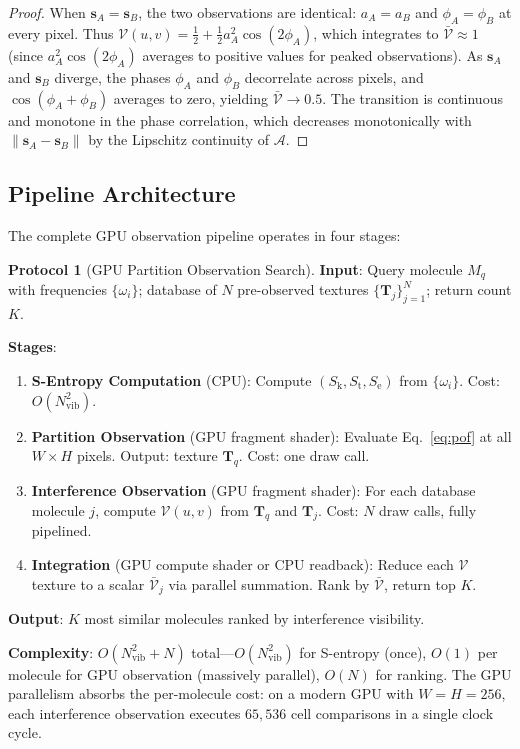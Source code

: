 \documentclass[11pt,twocolumn,a4paper]{article}
\theoremstyle{definition}
\newtheorem{protocol}[theorem]{Protocol}
\theoremstyle{remark}
\newcommand{\Sk}{S_{\mathrm{k}}}
\newcommand{\St}{S_{\mathrm{t}}}
\newcommand{\Se}{S_{\mathrm{e}}}
\newcommand{\Nvib}{N_{\mathrm{vib}}}
\begin{document}
\begin{proof}
When $\mathbf{s}_A = \mathbf{s}_B$, the two observations are identical: $a_A = a_B$ and $\phi_A = \phi_B$ at every pixel. Thus $\mathcal{V}(u,v) = \tfrac{1}{2} + \tfrac{1}{2}a_A^2 \cos(2\phi_A)$, which integrates to $\bar{\mathcal{V}} \approx 1$ (since $a_A^2\cos(2\phi_A)$ averages to positive values for peaked observations). As $\mathbf{s}_A$ and $\mathbf{s}_B$ diverge, the phases $\phi_A$ and $\phi_B$ decorrelate across pixels, and $\cos(\phi_A + \phi_B)$ averages to zero, yielding $\bar{\mathcal{V}} \to 0.5$. The transition is continuous and monotone in the phase correlation, which decreases monotonically with $\|\mathbf{s}_A - \mathbf{s}_B\|$ by the Lipschitz continuity of $\mathcal{A}$.
\end{proof}

\subsection{Pipeline Architecture}

The complete GPU observation pipeline operates in four stages:

\begin{protocol}[GPU Partition Observation Search]
\label{prot:gpu_search}
\textbf{Input}: Query molecule $M_q$ with frequencies $\{\omega_i\}$; database of $N$ pre-observed textures $\{\mathbf{T}_j\}_{j=1}^N$; return count $K$.

\textbf{Stages}:
\begin{enumerate}[nosep]
\item \textbf{S-Entropy Computation} (CPU): Compute $(\Sk, \St, \Se)$ from $\{\omega_i\}$. Cost: $O(\Nvib^2)$.
\item \textbf{Partition Observation} (GPU fragment shader): Evaluate Eq.~\eqref{eq:pof} at all $W \times H$ pixels. Output: texture $\mathbf{T}_q$. Cost: one draw call.
\item \textbf{Interference Observation} (GPU fragment shader): For each database molecule $j$, compute $\mathcal{V}(u,v)$ from $\mathbf{T}_q$ and $\mathbf{T}_j$. Cost: $N$ draw calls, fully pipelined.
\item \textbf{Integration} (GPU compute shader or CPU readback): Reduce each $\mathcal{V}$ texture to a scalar $\bar{\mathcal{V}}_j$ via parallel summation. Rank by $\bar{\mathcal{V}}$, return top $K$.
\end{enumerate}

\textbf{Output}: $K$ most similar molecules ranked by interference visibility.

\textbf{Complexity}: $O(\Nvib^2 + N)$ total---$O(\Nvib^2)$ for S-entropy (once), $O(1)$ per molecule for GPU observation (massively parallel), $O(N)$ for ranking. The GPU parallelism absorbs the per-molecule cost: on a modern GPU with $W = H = 256$, each interference observation executes $65{,}536$ cell comparisons in a single clock cycle.
\end{protocol}
\end{document}
